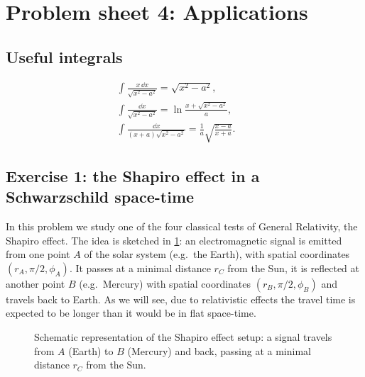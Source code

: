 \documentclass[11pt,a4paper]{article}
\numberwithin{equation}{subsection}
\begin{document}
\section{Problem sheet 4: Applications}

\subsection*{Useful integrals}
\begin{gather*}
  \int\frac{x\,\dd x}{\sqrt{x^2-a^2}}=\sqrt{x^2-a^2},\qquad\\
  \int\frac{\dd x}{\sqrt{x^2-a^2}}=\ln\frac{x+\sqrt{x^2-a^2}}{a},\qquad\\
  \int\frac{\dd x}{(x+a)\sqrt{x^2-a^2}}=\frac1a\sqrt{\frac{x-a}{x+a}} .
  \tag{0.1--0.3}
\end{gather*}

\subsection{Exercise 1: the Shapiro effect in a Schwarzschild space-time}

In this problem we study one of the four classical tests of General Relativity, the Shapiro effect. The idea is sketched in \cref{fig:shapiro}: an electromagnetic signal is emitted from one point $A$ of the solar system (e.g.\ the Earth), with spatial coordinates $(r_A,\pi/2,\phi_A)$. It passes at a minimal distance $r_C$ from the Sun, it is reflected at another point $B$ (e.g.\ Mercury) with spatial coordinates $(r_B,\pi/2,\phi_B)$ and travels back to Earth. As we will see, due to relativistic effects the travel time is expected to be longer than it would be in flat space-time.

\begin{figure}[ht]
\centering
{}
\caption{Schematic representation of the Shapiro effect setup: a signal travels from $A$ (Earth) to $B$ (Mercury) and back, passing at a minimal distance $r_C$ from the Sun.}
\label{fig:shapiro}
\end{figure}
\end{document}

